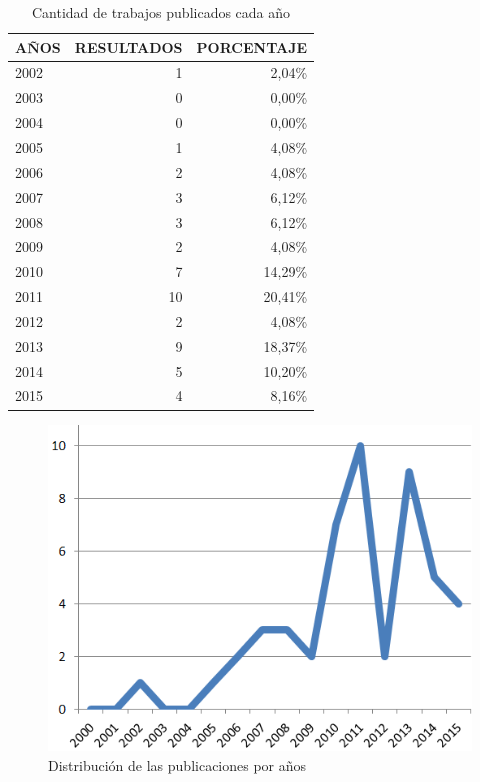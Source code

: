 
\begin{table}
  \begin{center}
  \begin{tabular}{| m{4cm} | r | r |}
    \hline
    AÑOS & RESULTADOS & PORCENTAJE\\
    \hline    
    \hline
    2002 & 1 & 2,04\% \\
    \hline
    2003 & 0 & 0,00\% \\
    \hline
    2004 & 0 & 0,00\%\\
    \hline
    2005 & 1 & 4,08\%\\
    \hline
    2006 & 2 & 4,08\%\\
    \hline
    2007 & 3 & 6,12\%\\
    \hline
    2008 & 3 & 6,12\%\\
    \hline
    2009 & 2 & 4,08\%\\
    \hline
    2010 & 7 & 14,29\%\\
    \hline
    2011 & 10 & 20,41\%\\
    \hline
    2012 & 2 & 4,08\%\\
    \hline
    2013 & 9 & 18,37\% \\
    \hline
    2014 & 5 & 10,20\%\\
    \hline
    2015 & 4 & 8,16\% \\
    \hline
  \end{tabular}
\end{center}
\caption{Cantidad de trabajos publicados cada año}
\label{tab:ResumenAniosResultados}
\end{table}

\begin{figure}
  \begin{center}
    \includegraphics[scale=0.4]{PublicacionesAnuales.png}
  \end{center}
  \caption{Distribución de las publicaciones por años}
  \label{fig:PublicacionesAnuales}
\end{figure}

